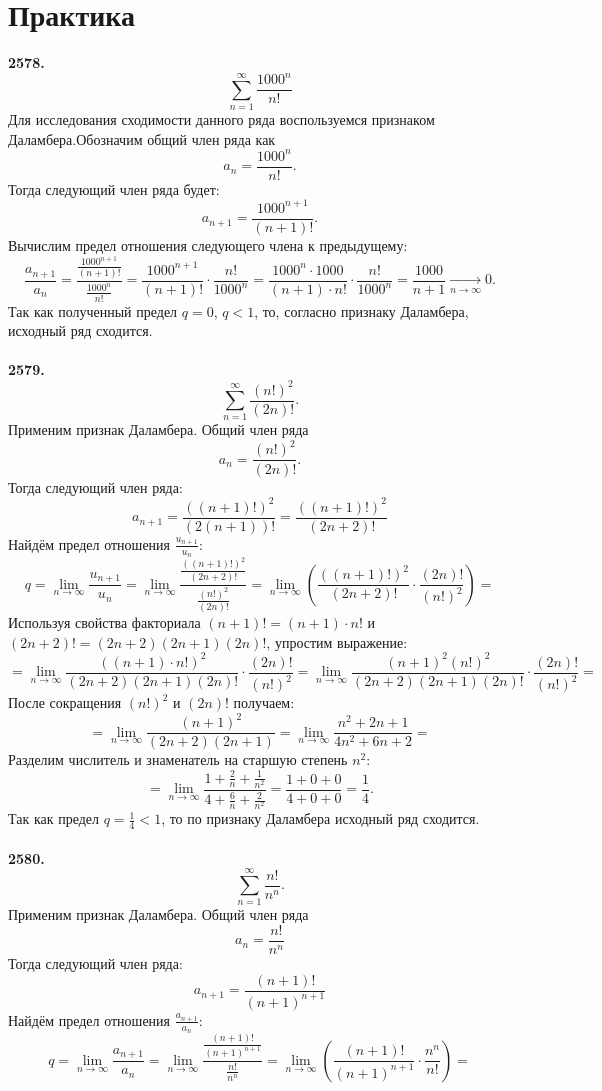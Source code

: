 \documentclass[a4paper, 12pt]{report}
\numberwithin{equation}{section}
\begin{document}
	\section*{Практика}
	\textbf{2578.}
	$$\sum_{n=1}^{\infty} \frac{1000^n}{n!} $$
	Для исследования сходимости данного ряда воспользуемся признаком Даламбера.Обозначим общий член ряда как $$a_n = \frac{1000^n}{n!}.$$
	{Тогда следующий член ряда будет:}
	$$a_{n+1} = \frac{1000^{n+1}}{(n+1)!}.$$
	{Вычислим предел отношения следующего члена к предыдущему:}
	$$\frac{a_{n+1}}{a_n} = \frac{\frac{1000^{n+1}}{(n+1)!}}{\frac{1000^n}{n!}} =  \frac{1000^{n+1}}{(n+1)!} \cdot \frac{n!}{1000^n}  =  \frac{1000^n \cdot 1000}{(n+1) \cdot n!} \cdot \frac{n!}{1000^n} = \frac{1000}{n+1} \xrightarrow[n\to\infty]{} 0. $$
	{Так как полученный предел } $q = 0$,  $q < 1$, {то, согласно признаку Даламбера, исходный ряд сходится.}
	\\\\
	\textbf{2579.}
	$$\sum_{n=1}^{\infty} \frac{(n!)^2}{(2n)!}.$$
	Применим признак Даламбера.
	Общий член ряда $$a_n = \frac{(n!)^2}{(2n)!}.$$
	Тогда следующий член ряда:
	$$ a_{n+1} = \frac{((n+1)!)^2}{(2(n+1))!} = \frac{((n+1)!)^2}{(2n+2)!} $$
	Найдём предел отношения $\frac{u_{n+1}}{u_n}$:
	$$ q = \lim_{n \to \infty} \frac{u_{n+1}}{u_n} = \lim_{n \to \infty} \frac{\frac{((n+1)!)^2}{(2n+2)!}}{\frac{(n!)^2}{(2n)!}} = \lim_{n \to \infty} \left( \frac{((n+1)!)^2}{(2n+2)!} \cdot \frac{(2n)!}{(n!)^2} \right) = $$
	Используя свойства факториала $(n+1)! = (n+1) \cdot n!$ и $(2n+2)! = (2n+2)(2n+1)(2n)!$, упростим выражение:
	$$ = \lim_{n \to \infty} \frac{((n+1) \cdot n!)^2}{(2n+2)(2n+1)(2n)!} \cdot \frac{(2n)!}{(n!)^2} = \lim_{n \to \infty} \frac{(n+1)^2 (n!)^2}{(2n+2)(2n+1)(2n)!} \cdot \frac{(2n)!}{(n!)^2} = $$
	После сокращения $(n!)^2$ и $(2n)!$ получаем:
	$$ = \lim_{n \to \infty} \frac{(n+1)^2}{(2n+2)(2n+1)} = \lim_{n \to \infty} \frac{n^2 + 2n + 1}{4n^2 + 6n + 2} = $$
	Разделим числитель и знаменатель на старшую степень $n^2$:
	$$ = \lim_{n \to \infty} \frac{1 + \frac{2}{n} + \frac{1}{n^2}}{4 + \frac{6}{n} + \frac{2}{n^2}} = \frac{1+0+0}{4+0+0} = \frac{1}{4}. $$
	Так как предел $q = \frac{1}{4} < 1$, то по признаку Даламбера исходный ряд сходится.
	\\\\
	\textbf{2580.}
	$$\sum_{n=1}^{\infty} \frac{n!}{n^n}.$$
	Применим признак Даламбера.
	Общий член ряда $$a_n = \frac{n!}{n^n}$$
	Тогда следующий член ряда:
	$$ a_{n+1} = \frac{(n+1)!}{(n+1)^{n+1}} $$
	Найдём предел отношения $\frac{a_{n+1}}{a_n}$:
	$$ q = \lim_{n \to \infty} \frac{a_{n+1}}{a_n} = \lim_{n \to \infty} \frac{\frac{(n+1)!}{(n+1)^{n+1}}}{\frac{n!}{n^n}} = \lim_{n \to \infty} \left( \frac{(n+1)!}{(n+1)^{n+1}} \cdot \frac{n^n}{n!} \right) = $$
\end{document}
